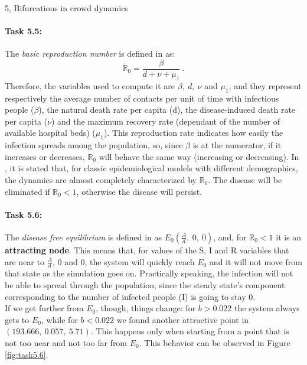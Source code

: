 \documentclass[10pt,a4paper]{article}
\begin{document}
\begin{task}{5, Bifurcations in crowd dynamics}
\paragraph{Task 5.5:}
The \textit{basic reproduction number} is defined in \cite{SHAN20141662} as:
\begin{equation}
    \mathbb{R}_0 = \frac{\beta}{d + \nu + \mu_1}\ .
\end{equation}
Therefore, the variables used to compute it are $\beta,\ d,\ \nu$ and $\mu_1$, and they represent respectively the average number of contacts per unit of time with infectious people ($\beta$), the natural death rate per capita (d), the disease-induced death rate per capita ($\nu$) and the maximum recovery rate (dependant of the number of available hospital beds) ($\mu_1$).
This reproduction rate indicates how easily the infection spreads among the population, so, since $\beta$ is at the numerator, if it increases or decreases, $\mathbb{R}_0$ will behave the same way (increasing or decreasing).
In \cite{SHAN20141662}, it is stated that, for classic epidemiological models with different demographics, the dynamics are almost completely characterized by $\mathbb{R}_0$.
The disease will be eliminated if $\mathbb{R}_0 < 1$, otherwise the disease will persist.

\paragraph{Task 5.6:}
The \textit{disease free equilibrium} is defined in \cite{SHAN20141662} as $E_0\left(\frac{A}{d},\ 0,\ 0\right)$, and, for $\mathbb{R}_0 < 1$ it is an \textbf{attracting node}.
This means that, for values of the S, I and R variables that are near to $\frac{A}{d}$, 0 and 0, the system will quickly reach $E_0$ and it will not move from that state as the simulation goes on.
Practically speaking, the infection will not be able to spread through the population, since the steady state's component corresponding to the number of infected people (I) is going to stay 0.\\
If we get further from $E_0$, though, things change: for $b > 0.022$ the system always gets to $E_0$, while for $b < 0.022$ we found another attractive point in $(193.666,\ 0.057,\ 5.71)$.
This happens only when starting from a point that is not too near and not too far from $E_0$.
This behavior can be observed in Figure \ref{fig:task5.6}.


\end{task}
\end{document}
